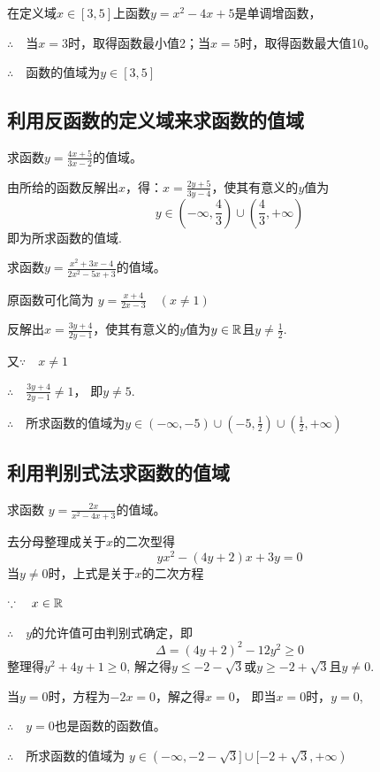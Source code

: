 \begin{solution}
    在定义域$x\in[3,5]$上函数$y=x^2-4x+5$是单调增函数，
    
$\therefore\quad $当$x=3$时，取得函数最小值2；当$x=5$时，取得函数最大值10。

$\therefore\quad $函数的值域为$y\in [3,5]$
\end{solution}


\subsection{利用反函数的定义域来求函数的值域}
\begin{example}
    求函数$y=\frac{4x+5}{3x-2}$的值域。
\end{example}

\begin{solution}
由所给的函数反解出$x$，得：$x=\frac{2y+5}{3y-4}$，使其有意义的$y$值为
\[y\in \left(-\infty,\frac{4}{3}\right)\cup \left(\frac{4}{3},+\infty\right)\]
即为所求函数的值域.

\end{solution}

\begin{example}
    求函数$y=\frac{x^2+3x-4}{2x^2-5x+3}$的值域。
\end{example}

\begin{solution}
原函数可化简为 $y=\frac{x+4}{2x-3}\quad (x\ne 1)$

反解出$x=\frac{3y+4}{2y-1}$，使其有意义的$y$值为$y\in\mathbb{R}$且$y\ne\frac{1}{2}$.

又$\because\quad x\ne 1$

$\therefore\quad \frac{3y+4}{2y-1}\ne 1$， 即$y\ne 5$.

$\therefore\quad $所求函数的值域为$y\in(-\infty,-5)\cup\left(-5,\frac{1}{2}\right)\cup \left(\frac{1}{2},+\infty\right)$
\end{solution}

\subsection{利用判别式法求函数的值域}

\begin{example}
 求函数
$y=\frac{2x}{x^2-4x+3}$的值域。   
\end{example}

\begin{solution}
    去分母整理成关于$x$的二次型得
\[yx^2-(4y+2)x+3y=0\]
当$y\ne 0$时，上式是关于$x$的二次方程

$\because\quad x\in\mathbb{R}$

$\therefore\quad y$的允许值可由判别式确定，即
\[\Delta =(4y+2)^2-12y^2\ge 0\]
整理得$y^2+4y+1\ge 0$, 
解之得$y\le -2-\sqrt{3}$或$y\ge -2+\sqrt{3}$且$y\ne 0$.

当$y=0$时，方程为$-2x=0$，解之得$x=0$，
即当$x=0$时，$y=0$,

$\therefore\quad y=0$也是函数的函数值。

$\therefore\quad $所求函数的值域为
$y\in (-\infty,-2-\sqrt{3}]\cup [-2+\sqrt{3},+\infty)$
\end{solution}

